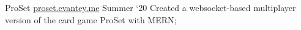 \project
    {ProSet \href{http://proset.evantey.me}{proset.evantey.me}}
    {Summer `20}
    {
        Created a websocket-based multiplayer version of the card game ProSet with MERN;
    }
